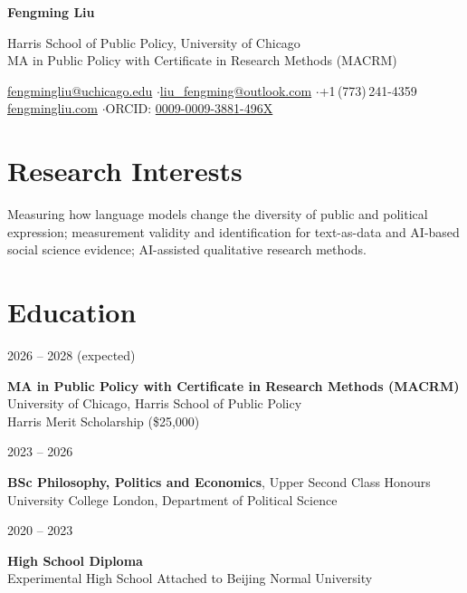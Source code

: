 \documentclass[11pt, a4paper]{article}
\newlength{\datelength}
\newlength{\contentlength}
\newcommand{\cventry}[2]{%
  \noindent
  \begin{minipage}[t]{\datelength}
    \raggedright #1
  \end{minipage}%
  \hspace{0.4cm}%
  \begin{minipage}[t]{\contentlength}
    \raggedright #2
  \end{minipage}%
  \par\vspace{6pt}%
}
\begin{document}
\begin{center}
  {\LARGE\bfseries Fengming Liu}\par\vspace{4pt}
  Harris School of Public Policy, University of Chicago\\
  MA in Public Policy with Certificate in Research Methods (MACRM)\par\vspace{2pt}
  \href{mailto:fengmingliu@uchicago.edu}{fengmingliu@uchicago.edu}
  \enspace$\cdot$\enspace \href{mailto:liu_fengming@outlook.com}{liu\_fengming@outlook.com}
  \enspace$\cdot$\enspace +1\,(773)\,241-4359\\
  \href{https://fengmingliu.com/}{fengmingliu.com}
  \enspace$\cdot$\enspace ORCID: \href{https://orcid.org/0009-0009-3881-496X}{0009-0009-3881-496X}
\end{center}

\section{Research Interests}
Measuring how language models change the diversity of public and political expression; measurement validity and identification for text-as-data and AI-based social science evidence; AI-assisted qualitative research methods.

\section{Education}

\cventry{2026 -- 2028 (expected)}{%
  \textbf{MA in Public Policy with Certificate in Research Methods (MACRM)}\\
  University of Chicago, Harris School of Public Policy\\
  Harris Merit Scholarship (\$25,000)}

\cventry{2023 -- 2026}{%
  \textbf{BSc Philosophy, Politics and Economics}, Upper Second Class Honours\\
  University College London, Department of Political Science}

\cventry{2020 -- 2023}{%
  \textbf{High School Diploma}\\
  Experimental High School Attached to Beijing Normal University}
\end{document}

